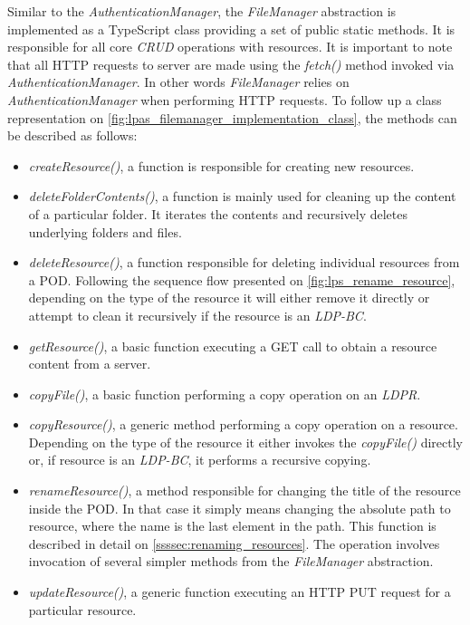 Similar to the \textit{AuthenticationManager}, the \textit{FileManager} abstraction is implemented as a TypeScript class providing a set of public static methods. It is responsible for all core \textit{CRUD} operations with \solid{} resources. It is important to note that all HTTP requests to \solid{} server are made using the \textit{fetch()} method invoked via \textit{AuthenticationManager}. In other words \textit{FileManager} relies on \textit{AuthenticationManager} when performing HTTP requests. To follow up a class representation on \autoref{fig:lpas_filemanager_implementation_class}, the methods can be described as follows:
\begin{itemize}
    \item \textit{createResource()}, a function is responsible for creating new \solid{} resources. 
    \item \textit{deleteFolderContents()}, a function is mainly used for cleaning up the content of a particular folder. It iterates the contents and recursively deletes underlying folders and files.
    \item \textit{deleteResource()}, a function responsible for deleting individual resources from a \solid{} POD. Following the sequence flow presented on \autoref{fig:lps_rename_resource}, depending on the type of the resource it will either remove it directly or attempt to clean it recursively if the resource is an \textit{LDP-BC}.
    \item \textit{getResource()}, a basic function executing a GET call to obtain a resource content from a \solid{} server.
    \item \textit{copyFile()}, a basic function performing a copy operation on an \textit{LDPR}.
    \item \textit{copyResource()}, a generic method performing a copy operation on a resource. Depending on the type of the resource it either invokes the \textit{copyFile()} directly or, if resource is an \textit{LDP-BC}, it performs a recursive copying.
    \item \textit{renameResource()}, a method responsible for changing the title of the resource inside the \solid{} POD. In that case it simply means changing the absolute path to resource, where the name is the last element in the path. This function is described in detail on \autoref{ssssec:renaming_resources}. The operation involves invocation of several simpler methods from the \textit{FileManager} abstraction.
    \item \textit{updateResource()}, a generic function executing an HTTP PUT request for a particular resource.

\end{itemize}

